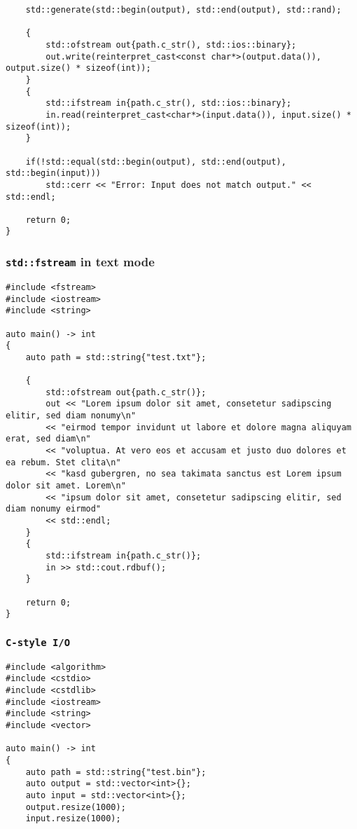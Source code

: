 \begin{appendix}
\begin{lstlisting}
    std::generate(std::begin(output), std::end(output), std::rand);
    
    {
        std::ofstream out{path.c_str(), std::ios::binary};
        out.write(reinterpret_cast<const char*>(output.data()), output.size() * sizeof(int));
    }
    {
        std::ifstream in{path.c_str(), std::ios::binary};
        in.read(reinterpret_cast<char*>(input.data()), input.size() * sizeof(int));
    }
    
    if(!std::equal(std::begin(output), std::end(output), std::begin(input)))
        std::cerr << "Error: Input does not match output." << std::endl;
        
    return 0;
}
\end{lstlisting}

\subsubsection{\texttt{std::fstream} in text mode}\label{app:scorep_text_fstream}

\begin{lstlisting}
#include <fstream>
#include <iostream>
#include <string>

auto main() -> int
{
    auto path = std::string{"test.txt"};
    
    {
        std::ofstream out{path.c_str()};
        out << "Lorem ipsum dolor sit amet, consetetur sadipscing elitir, sed diam nonumy\n"
        << "eirmod tempor invidunt ut labore et dolore magna aliquyam erat, sed diam\n"
		<< "voluptua. At vero eos et accusam et justo duo dolores et ea rebum. Stet clita\n"
		<< "kasd gubergren, no sea takimata sanctus est Lorem ipsum dolor sit amet. Lorem\n"
		<< "ipsum dolor sit amet, consetetur sadipscing elitir, sed diam nonumy eirmod"
		<< std::endl;
	}
	{
		std::ifstream in{path.c_str()};
		in >> std::cout.rdbuf();
	}
	
	return 0;
}
\end{lstlisting}

\subsubsection{\texttt{C-style I/O}}\label{app:scorep_c_io}

\begin{lstlisting}
#include <algorithm>
#include <cstdio>
#include <cstdlib>
#include <iostream>
#include <string>
#include <vector>

auto main() -> int
{
    auto path = std::string{"test.bin"};
    auto output = std::vector<int>{};
    auto input = std::vector<int>{};
    output.resize(1000);
    input.resize(1000);
    

\end{lstlisting}
\end{appendix}
